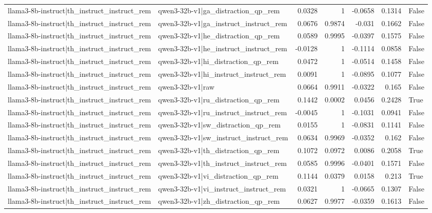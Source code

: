 \begin{table}
\begin{tabular}{l l r r r r l}
llama3-8b-instruct|th_instruct_instruct_rem & qwen3-32b-v1|ga_distraction_qp_rem & 0.0328 & 1 & -0.0658 & 0.1314 & False \\
llama3-8b-instruct|th_instruct_instruct_rem & qwen3-32b-v1|ga_instruct_instruct_rem & 0.0676 & 0.9874 & -0.031 & 0.1662 & False \\
llama3-8b-instruct|th_instruct_instruct_rem & qwen3-32b-v1|he_distraction_qp_rem & 0.0589 & 0.9995 & -0.0397 & 0.1575 & False \\
llama3-8b-instruct|th_instruct_instruct_rem & qwen3-32b-v1|he_instruct_instruct_rem & -0.0128 & 1 & -0.1114 & 0.0858 & False \\
llama3-8b-instruct|th_instruct_instruct_rem & qwen3-32b-v1|hi_distraction_qp_rem & 0.0472 & 1 & -0.0514 & 0.1458 & False \\
llama3-8b-instruct|th_instruct_instruct_rem & qwen3-32b-v1|hi_instruct_instruct_rem & 0.0091 & 1 & -0.0895 & 0.1077 & False \\
llama3-8b-instruct|th_instruct_instruct_rem & qwen3-32b-v1|raw & 0.0664 & 0.9911 & -0.0322 & 0.165 & False \\
llama3-8b-instruct|th_instruct_instruct_rem & qwen3-32b-v1|ru_distraction_qp_rem & 0.1442 & 0.0002 & 0.0456 & 0.2428 & True \\
llama3-8b-instruct|th_instruct_instruct_rem & qwen3-32b-v1|ru_instruct_instruct_rem & -0.0045 & 1 & -0.1031 & 0.0941 & False \\
llama3-8b-instruct|th_instruct_instruct_rem & qwen3-32b-v1|sw_distraction_qp_rem & 0.0155 & 1 & -0.0831 & 0.1141 & False \\
llama3-8b-instruct|th_instruct_instruct_rem & qwen3-32b-v1|sw_instruct_instruct_rem & 0.0634 & 0.9969 & -0.0352 & 0.162 & False \\
llama3-8b-instruct|th_instruct_instruct_rem & qwen3-32b-v1|th_distraction_qp_rem & 0.1072 & 0.0972 & 0.0086 & 0.2058 & True \\
llama3-8b-instruct|th_instruct_instruct_rem & qwen3-32b-v1|th_instruct_instruct_rem & 0.0585 & 0.9996 & -0.0401 & 0.1571 & False \\
llama3-8b-instruct|th_instruct_instruct_rem & qwen3-32b-v1|vi_distraction_qp_rem & 0.1144 & 0.0379 & 0.0158 & 0.213 & True \\
llama3-8b-instruct|th_instruct_instruct_rem & qwen3-32b-v1|vi_instruct_instruct_rem & 0.0321 & 1 & -0.0665 & 0.1307 & False \\
llama3-8b-instruct|th_instruct_instruct_rem & qwen3-32b-v1|zh_distraction_qp_rem & 0.0627 & 0.9977 & -0.0359 & 0.1613 & False \\

\end{tabular}
\end{table}
